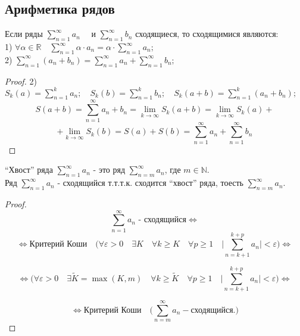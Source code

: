 \documentclass[14pt,a4paper]{scrartcl}
\theoremstyle{definition}
\theoremstyle{remark}
\theoremstyle{definition}
\theoremstyle{definition}
\begin{document}
\subsection{Арифметика рядов}
\begin{boxteo}
Если ряды $ \sum\limits_{n = 1}^{ \infty}{a_n}\quad $ и $ \sum\limits_{n = 1}^{ \infty}{b_n} $ сходящиеся, то сходящимися являются:\\
  1) $\forall \alpha \in \mathbb{R} \quad  \sum\limits_{n = 1}^{ \infty}{\alpha \cdot a_n} =   \alpha \cdot \sum\limits_{n = 1}^{ \infty}{a_n}; $\\
  2) $  \sum\limits_{n = 1}^{ \infty}{(a_n + b_n)} =  \sum\limits_{n = 1}^{ \infty}{a_n} +  \sum\limits_{n = 1}^{ \infty}{b_n}; $\\

 \end{boxteo}
\begin{proof}
2) $S_k(a) =  \sum\limits_{n = 1}^{k}{a_n}; \quad S_k(b) =  \sum\limits_{n = 1}^{k}{b_n}; \quad S_k(a+b) =  \sum\limits_{n = 1}^{k}{(a_n + b_n)};$\\
$$S(a+b) =  \sum\limits_{n = 1}^{ \infty}{a_n + b_n} =  \lim\limits_{k\to  \infty}{S_k(a+b)} =  \lim\limits_{k\to  \infty}{S_k(a)} +$$$$+  \lim\limits_{k\to  \infty}{S_k(b)} = S(a) + S(b) =  \sum\limits_{n = 1}^{ \infty}{a_n}+  \sum\limits_{n = 1}^{ \infty}{b_n}  $$
\end{proof}

 \begin{boxteo}
 ``Хвост'' ряда $ \sum\limits_{n = 1}^{ \infty}{a_n}$ - это ряд $ \sum\limits_{n = m}^{ \infty}{a_n}$, где $ m \in \mathbb{N} $.\\

  Ряд $ \sum\limits_{n = 1}^{ \infty}{a_n} $ - сходящийся т.т.т.к. сходится ``хвост'' ряда, тоесть $ \sum\limits_{n = m}^{ \infty}{a_n} $.
\end{boxteo}
\begin{proof}
 $$ \sum\limits_{n = 1}^{ \infty}{a_n} \text{ - сходящийся}  \Longleftrightarrow $$
 $$ \Longleftrightarrow \text{Критерий Коши}\quad  \Bigg( \forall \varepsilon >0\quad \exists K \quad
 \forall k \geq K  \quad\forall p\geq 1 \quad \Bigg\vert   \sum\limits_{n = k+1}^{k+p}{a_n}  \Bigg\vert  < \varepsilon   \Bigg) \Longleftrightarrow $$

 $$\Longleftrightarrow
 \Bigg( \forall \varepsilon > 0 \quad
 \exists \tilde{K} = \max(K,m) \quad \forall k\geq \tilde{K} \quad \forall p\geq 1 \quad  \Bigg\vert  \sum\limits_{n = k+1}^{k+p}{a_n} \Bigg\vert < \varepsilon  \Bigg) \Longleftrightarrow $$

 $$ \Longleftrightarrow \text{Критерий Коши}\quad  \Bigg(  \sum\limits_{n = m}^{ \infty}{a_n} - \text{сходящийся.}  \Bigg)$$


\end{proof}
\end{document}
